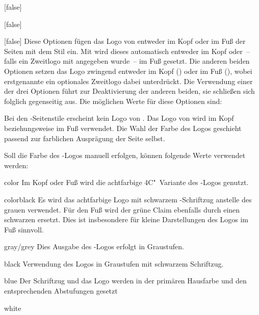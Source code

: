 \documentclass[english,ngerman,ToDo=no,fontspec=no]{tudscrman3}
\begin{document}
\begin{Declaration}{}[false]
\begin{Declaration}[v2.02]{}[false]
\begin{Declaration}{}[false]
\printdeclarationlist%
%
%
%
%
%
Diese Optionen fügen das Logo von \DDC entweder im Kopf oder im Fuß der Seiten
mit dem Stil  ein. Mit  wird dieses 
automatisch entweder im Kopf oder~-- falls ein Zweitlogo mit  
angegeben wurde~-- im Fuß gesetzt. Die anderen beiden Optionen setzen das Logo 
zwingend entweder im Kopf () oder im Fuß (), 
wobei erstgenannte ein optionales Zweitlogo dabei unterdrückt. Die Verwendung 
einer der drei Optionen führt zur Deaktivierung der anderen beiden, sie 
schließen sich folglich gegenseitig aus. Die möglichen Werte für diese Optionen 
sind:
%
\begin{values}{}
\itemfalse
  Bei den -Seitenstile erscheint kein Logo von \DDC.
\itemtrue*
  Das Logo von \DDC wird im Kopf beziehungsweise im Fuß verwendet. Die Wahl der 
  Farbe des Logos geschieht passend zur farblichen Ausprägung der Seite selbst.
\end{values}
%
Soll die Farbe des \DDC-Logos manuell erfolgen, können folgende Werte verwendet 
werden:
%
\begin{values}{}
\item[color]
  Im Kopf oder Fuß wird die achtfarbige 4C"~Variante des \DDC-Logos genutzt.
\item[colorblack]
  Es wird das achtfarbige Logo mit schwarzem \DDC-Schriftzug anstelle des 
  grauen verwendet. Für den Fuß wird der grüne Claim ebenfalls durch einen 
  schwarzen ersetzt. Dies ist insbesondere für kleine Darstellungen des Logos 
  im Fuß sinnvoll.
\item[gray/grey]
  Dies Ausgabe des \DDC-Logos erfolgt in Graustufen.
\item[black]
  Verwendung des Logos in Graustufen mit schwarzem Schriftzug.
\item[blue]
  Der Schriftzug und das Logo werden in der primären Hausfarbe  
  und den entsprechenden Abstufungen gesetzt
\item[white]

\end{values}
\end{Declaration}
\end{Declaration}
\end{Declaration}
\end{document}
